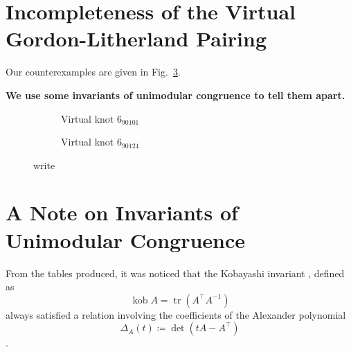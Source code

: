 \documentclass[12pt]{report}
\newcommand{\kob}{\operatorname{kob}}
\newcommand{\notered}[1]{{\color{Red} \textbf{#1}}}
\theoremstyle{upright}
\begin{document}
\section{Incompleteness of the Virtual Gordon-Litherland Pairing}

Our counterexamples are given in Fig.~\ref{fig:counterexamples}.

\notered{We use some invariants of unimodular congruence to tell them apart.}

\begin{figure}[H]
	\centering
	\hspace*{\fill}
	\begin{subfigure}[b]{0.4 \textwidth}
		\centering
		\def\svgscale{0.35}
		
		\caption{Virtual knot $6_{90101}$}
		\label{fig:6-90101_vknot}
	\end{subfigure}
	\hspace*{\fill}	\hspace*{\fill}	\hspace*{\fill}
	\begin{subfigure}[b]{0.4 \textwidth}
		\centering
		\def\svgscale{0.35}
		
		\caption{Virtual knot $6_{90124}$}
		\label{fig:6-90124_vknot}
	\end{subfigure}
	\hspace*{\fill} 
	\caption{write}
	\label{fig:counterexamples}
\end{figure}

\section{A Note on Invariants of Unimodular Congruence}

From the tables produced, it was noticed that the Kobayashi invariant \cite{new-invariant-under-congruence}, defined as
\[\kob A = \operatorname{tr}(A^{\top}A^{-1})\]
always satisfied a relation involving the coefficients of the Alexander polynomial
\[\Delta_{A}(t) \coloneq \det(tA - A^{\top})\] \cite{mock-seifert-matrices}.
\end{document}
